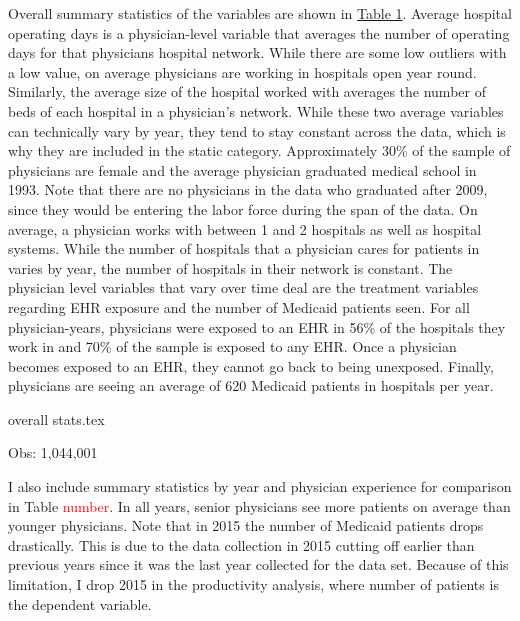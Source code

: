 \documentclass[11pt]{article}
\begin{document}
Overall summary statistics of the variables are shown in \hyperref[fig:summarystatistics]{Table 1}. Average hospital operating days is a physician-level variable that averages the number of operating days for that physicians hospital network. While there are some low outliers with a low value, on average physicians are working in hospitals open year round. Similarly, the average size of the hospital worked with averages the number of beds of each hospital in a physician's network. While these two average variables can technically vary by year, they tend to stay constant across the data, which is why they are included in the static category. Approximately 30\% of the sample of physicians are female and the average physician graduated medical school in 1993. Note that there are no physicians in the data who graduated after 2009, since they would be entering the labor force during the span of the data. On average, a physician works with between 1 and 2 hospitals as well as hospital systems. While the number of hospitals that a physician cares for patients in varies by year, the number of hospitals in their network is constant. The physician level variables that vary over time deal are the treatment variables regarding EHR exposure and the number of Medicaid patients seen. For all physician-years, physicians were exposed to an EHR in 56\% of the hospitals they work in and 70\% of the sample is exposed to any EHR. Once a physician becomes exposed to an EHR, they cannot go back to being unexposed. Finally, physicians are seeing an average of 620 Medicaid patients in hospitals per year.

\vspace{5mm}
\begin{table}[ht]
    {overall stats.tex}
    \label{fig:summarystatistics}
    \vspace{1mm}
    \caption*{\footnotesize Obs: 1,044,001}
\end{table}
\vspace{5mm}

I also include summary statistics by year and physician experience for comparison in Table \textcolor{red}{number}. In all years, senior physicians see more patients on average than younger physicians. Note that in 2015 the number of Medicaid patients drops drastically. This is due to the data collection in 2015 cutting off earlier than previous years since it was the last year collected for the data set. Because of this limitation, I drop 2015 in the productivity analysis, where number of patients is the dependent variable. 
\end{document}
